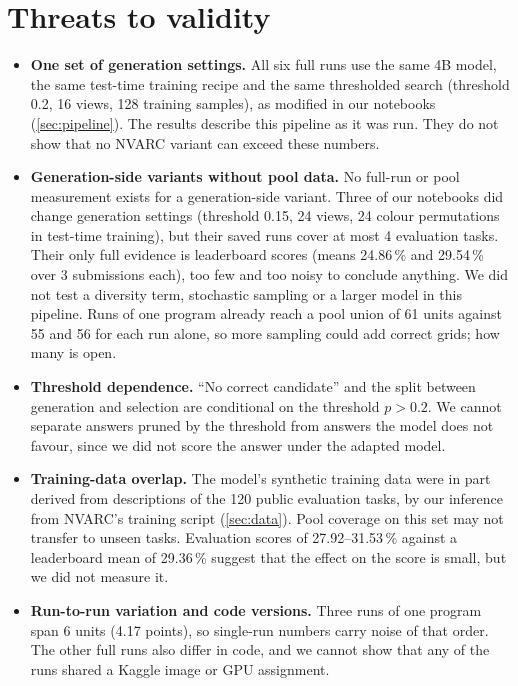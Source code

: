 \documentclass[11pt]{article}
\begin{document}
\section{Threats to validity}
\label{sec:limitations}

\begin{itemize}
\item \textbf{One set of generation settings.} All six full runs use the same 4B model, the same test-time training recipe and the same thresholded search (threshold 0.2, 16 views, 128 training samples), as modified in our notebooks (\cref{sec:pipeline}). The results describe this pipeline as it was run. They do not show that no NVARC variant can exceed these numbers.
\item \textbf{Generation-side variants without pool data.} No full-run or pool measurement exists for a generation-side variant. Three of our notebooks did change generation settings (threshold 0.15, 24 views, 24 colour permutations in test-time training), but their saved runs cover at most 4 evaluation tasks. Their only full evidence is leaderboard scores (means 24.86\,\% and 29.54\,\% over 3 submissions each), too few and too noisy to conclude anything. We did not test a diversity term, stochastic sampling or a larger model in this pipeline. Runs of one program already reach a pool union of 61 units against 55 and 56 for each run alone, so more sampling could add correct grids; how many is open.
\item \textbf{Threshold dependence.} ``No correct candidate'' and the split between generation and selection are conditional on the threshold $p > 0.2$. We cannot separate answers pruned by the threshold from answers the model does not favour, since we did not score the answer under the adapted model.
\item \textbf{Training-data overlap.} The model's synthetic training data were in part derived from descriptions of the 120 public evaluation tasks, by our inference from NVARC's training script (\cref{sec:data}). Pool coverage on this set may not transfer to unseen tasks. Evaluation scores of 27.92--31.53\,\% against a leaderboard mean of 29.36\,\% suggest that the effect on the score is small, but we did not measure it.
\item \textbf{Run-to-run variation and code versions.} Three runs of one program span 6 units (4.17 points), so single-run numbers carry noise of that order. The other full runs also differ in code, and we cannot show that any of the runs shared a Kaggle image or GPU assignment.

\end{itemize}
\end{document}
